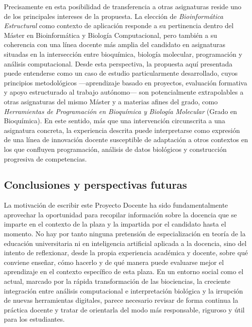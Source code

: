 \documentclass[
  11pt,
  a4paper,
  twoside]{scrreprt}
\begin{document}
Precisamente en esta posibilidad de transferencia a otras asignaturas
reside uno de los principales intereses de la propuesta. La elección de
\emph{Bioinformática Estructural} como contexto de aplicación responde a
su pertinencia dentro del Máster en Bioinformática y Biología
Computacional, pero también a su coherencia con una línea docente más
amplia del candidato en asignaturas situadas en la intersección entre
bioquímica, biología molecular, programación y análisis computacional.
Desde esta perspectiva, la propuesta aquí presentada puede entenderse
como un caso de estudio particularmente desarrollado, cuyos principios
metodológicos ---aprendizaje basado en proyectos, evaluación formativa y
apoyo estructurado al trabajo autónomo--- son potencialmente
extrapolables a otras asignaturas del mismo Máster y a materias afines
del grado, como \emph{Herramientas de Programación en Bioquímica y
Biología Molecular} (Grado en Bioquímica). En este sentido, más que una
intervención circunscrita a una asignatura concreta, la experiencia
descrita puede interpretarse como expresión de una línea de innovación
docente susceptible de adaptación a otros contextos en los que confluyen
programación, análisis de datos biológicos y construcción progresiva de
competencias.

\subsection{Conclusiones y perspectivas
futuras}\label{conclusiones-y-perspectivas-futuras}

La motivación de escribir este Proyecto Docente ha sido fundamentalmente
aprovechar la oportunidad para recopilar información sobre la docencia
que se imparte en el contexto de la plaza y la impartida por el
candidato hasta el momento. No hay por tanto ninguna pretensión de
especialización en teoría de la educación universitaria ni en
inteligencia artificial aplicada a la docencia, sino del intento de
reflexionar, desde la propia experiencia académica y docente, sobre qué
conviene enseñar, cómo hacerlo y de qué manera puede evaluarse mejor el
aprendizaje en el contexto específico de esta plaza. En un entorno
social como el actual, marcado por la rápida transformación de las
biociencias, la creciente integración entre análisis computacional e
interpretación biológica y la irrupción de nuevas herramientas
digitales, parece necesario revisar de forma continua la práctica
docente y tratar de orientarla del modo más responsable, riguroso y útil
para los estudiantes.
\end{document}
